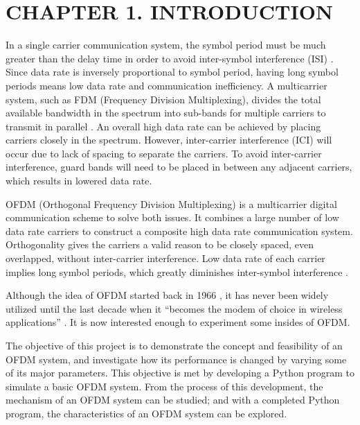\section*{CHAPTER 1. INTRODUCTION}
\setcounter{section}{1}
\setcounter{subsection}{0}
\setcounter{figure}{0}
\setcounter{table}{0}

In a single carrier communication system, the symbol period must be much  greater than the delay time in order to avoid inter-symbol interference (ISI) \cite{b1}. Since data rate is inversely proportional to symbol period, having long symbol periods means low data rate and communication inefficiency. A multicarrier system, such as FDM (Frequency Division Multiplexing), divides the total available bandwidth in the spectrum into sub-bands for multiple carriers to transmit in parallel \cite{b2}. An overall high data rate can be achieved by placing carriers closely in the spectrum. However, inter-carrier interference (ICI) will occur due to lack of spacing to separate the carriers. To avoid inter-carrier interference, guard bands will need to be placed in between any adjacent carriers, which results in lowered data rate.

OFDM (Orthogonal Frequency Division Multiplexing) is a multicarrier digital communication scheme to solve both issues. It combines a large number of low data rate carriers to construct a composite high data rate communication system. Orthogonality gives the carriers a valid reason to be closely spaced, even overlapped, without inter-carrier interference. Low data rate of each carrier implies long symbol periods, which greatly diminishes inter-symbol interference \cite{b3}.

Although the idea of OFDM started back in 1966 \cite{b4}, it has never been widely utilized until the last decade when it “becomes the modem of choice in wireless applications” \cite{b5}. It is now interested enough to experiment some insides of OFDM.

The objective of this project is to demonstrate the concept and feasibility of an OFDM system, and investigate how its performance is changed by varying some of its major parameters. This objective is met by developing a Python program to simulate a basic OFDM system. From the process of this development, the mechanism of an OFDM system can be studied; and with a completed Python program, the characteristics of an OFDM system can be explored.